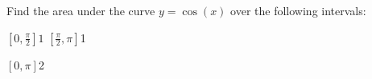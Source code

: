 \noindent Find the area under the curve $y=\cos{(x)}$ over the following intervals:

\pairofprobsans%
{$\displaystyle \left[0, \frac{\pi}{2}\right]$}{$1$}%
{$\displaystyle \left[\frac{\pi}{2}, \pi \right]$}{1}%

\problemans%
{$\displaystyle \left[0, \pi\right]$}{$$2}%






